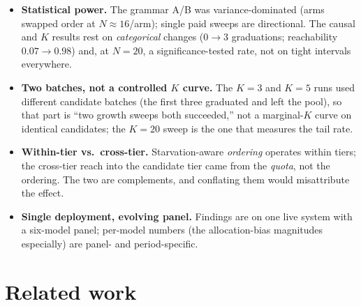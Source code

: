 \documentclass[letterpaper,twocolumn,10pt]{article}
\begin{document}
\begin{itemize}
\item \textbf{Statistical power.} The grammar A/B was variance-dominated (arms swapped order at $N\approx16$/arm); single paid sweeps are directional. The causal and $K$ results rest on \emph{categorical} changes ($0\to3$ graduations; reachability $0.07\to0.98$) and, at $N{=}20$, a significance-tested rate, not on tight intervals everywhere.
\item \textbf{Two batches, not a controlled $K$ curve.} The $K{=}3$ and $K{=}5$ runs used different candidate batches (the first three graduated and left the pool), so that part is ``two growth sweeps both succeeded,'' not a marginal-$K$ curve on identical candidates; the $K{=}20$ sweep is the one that measures the tail rate.
\item \textbf{Within-tier vs.\ cross-tier.} Starvation-aware \emph{ordering} operates within tiers; the cross-tier reach into the candidate tier came from the \emph{quota}, not the ordering. The two are complements, and conflating them would misattribute the effect.
\item \textbf{Single deployment, evolving panel.} Findings are on one live system with a six-model panel; per-model numbers (the allocation-bias magnitudes especially) are panel- and period-specific.
\end{itemize}

\section{Related work}
\end{document}
